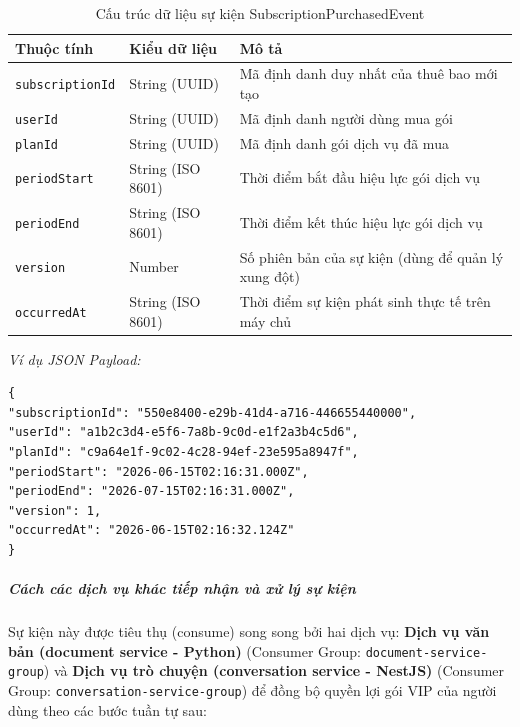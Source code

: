 \begin{table}[H]
\centering
\begin{tabular}{|l|l|l|}
\hline
\textbf{Thuộc tính} & \textbf{Kiểu dữ liệu} & \textbf{Mô tả} \\ \hline
\texttt{subscriptionId} & String (UUID) & Mã định danh duy nhất của thuê bao mới tạo \\ \hline
\texttt{userId} & String (UUID) & Mã định danh người dùng mua gói \\ \hline
\texttt{planId} & String (UUID) & Mã định danh gói dịch vụ đã mua \\ \hline
\texttt{periodStart} & String (ISO 8601) & Thời điểm bắt đầu hiệu lực gói dịch vụ \\ \hline
\texttt{periodEnd} & String (ISO 8601) & Thời điểm kết thúc hiệu lực gói dịch vụ \\ \hline
\texttt{version} & Number & Số phiên bản của sự kiện (dùng để quản lý xung đột) \\ \hline
\texttt{occurredAt} & String (ISO 8601) & Thời điểm sự kiện phát sinh thực tế trên máy chủ \\ \hline
\end{tabular}
\caption{Cấu trúc dữ liệu sự kiện SubscriptionPurchasedEvent}
\label{tab:event-payload-schema}
\end{table}

\textit{Ví dụ JSON Payload:}
\begin{verbatim}
{
"subscriptionId": "550e8400-e29b-41d4-a716-446655440000",
"userId": "a1b2c3d4-e5f6-7a8b-9c0d-e1f2a3b4c5d6",
"planId": "c9a64e1f-9c02-4c28-94ef-23e595a8947f",
"periodStart": "2026-06-15T02:16:31.000Z",
"periodEnd": "2026-07-15T02:16:31.000Z",
"version": 1,
"occurredAt": "2026-06-15T02:16:32.124Z"
}
\end{verbatim}

\subparagraph{Cách các dịch vụ khác tiếp nhận và xử lý sự kiện}
Sự kiện này được tiêu thụ (consume) song song bởi hai dịch vụ: \textbf{Dịch vụ văn bản (document service - Python)} (Consumer Group: \texttt{document-service-group}) và \textbf{Dịch vụ trò chuyện (conversation service - NestJS)} (Consumer Group: \texttt{conversation-service-group}) để đồng bộ quyền lợi gói VIP của người dùng theo các bước tuần tự sau:

